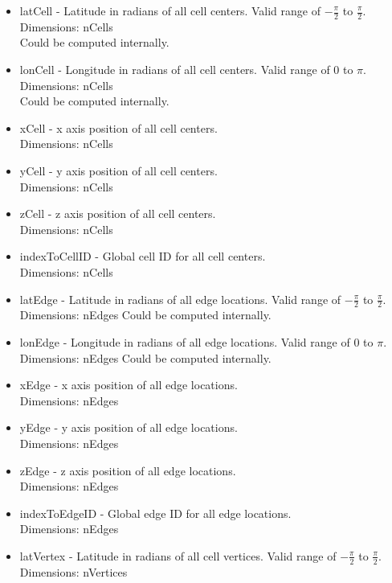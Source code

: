 \documentclass[11pt]{report}
\begin{document}
\begin{itemize}
	\item latCell - Latitude in radians of all cell centers. Valid range of $-\frac{\pi}{2}$ to $\frac{\pi}{2}$.\\
		  Dimensions: nCells \\
		  Could be computed internally. 
	\item lonCell - Longitude in radians of all cell centers. Valid range of $0$ to $\pi$. \\
		  Dimensions: nCells \\
		  Could be computed internally. 
	\item xCell - x axis position of all cell centers. \\
		  Dimensions: nCells
	\item yCell - y axis position of all cell centers. \\
		  Dimensions: nCells
	\item zCell - z axis position of all cell centers. \\
		  Dimensions: nCells
	\item indexToCellID - Global cell ID for all cell centers. \\
		  Dimensions: nCells
	\item latEdge - Latitude in radians of all edge locations. Valid range of $-\frac{\pi}{2}$ to $\frac{\pi}{2}$. \\
		  Dimensions: nEdges
		  Could be computed internally. 
	\item lonEdge - Longitude in radians of all edge locations. Valid range of $0$ to $\pi$. \\
		  Dimensions: nEdges
		  Could be computed internally. 
	\item xEdge - x axis position of all edge locations. \\
		  Dimensions: nEdges
	\item yEdge - y axis position of all edge locations. \\
		  Dimensions: nEdges
	\item zEdge - z axis position of all edge locations. \\
		  Dimensions: nEdges
	\item indexToEdgeID - Global edge ID for all edge locations. \\
		  Dimensions: nEdges
	\item latVertex - Latitude in radians of all cell vertices. Valid range of $-\frac{\pi}{2}$ to $\frac{\pi}{2}$. \\
		  Dimensions: nVertices

\end{itemize}
\end{document}
